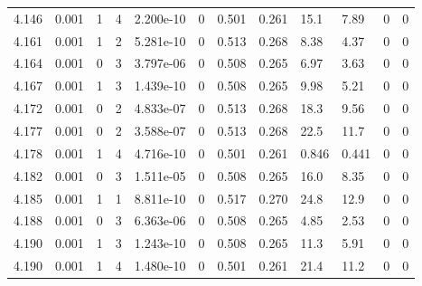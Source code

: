 \documentclass[preview]{standalone}
\begin{document}
{{{{{{{{{{\begin{tabular}{L{1.2cm}C{1.2cm} C{0.3cm}C{0.5cm} C{1.4cm}C{1.4cm} C{1.4cm}C{1.4cm} C{1.6cm}C{1.6cm} C{1.6cm}C{1.6cm}}
  4.146  &  0.001  & 1     &  4 &  2.200e-10  & 0  &  0.501&   0.261& 15.1 & 7.89   &  0 & 0  \\ 
  4.161  &  0.001  & 1     &  2 &  5.281e-10  & 0  &  0.513&   0.268& 8.38 & 4.37   &  0 & 0  \\ 
  4.164  &  0.001  & 0     &  3 &  3.797e-06  & 0  &  0.508&   0.265& 6.97 & 3.63   &  0 & 0  \\ 
  4.167  &  0.001  & 1     &  3 &  1.439e-10  & 0  &  0.508&   0.265& 9.98 & 5.21   &  0 & 0  \\ 
  4.172  &  0.001  & 0     &  2 &  4.833e-07  & 0  &  0.513&   0.268& 18.3 & 9.56   &  0 & 0  \\ 
  4.177  &  0.001  & 0     &  2 &  3.588e-07  & 0  &  0.513&   0.268& 22.5 & 11.7   &  0 & 0  \\ 
  4.178  &  0.001  & 1     &  4 &  4.716e-10  & 0  &  0.501&   0.261& 0.846 & 0.441   &  0 & 0  \\ 
  4.182  &  0.001  & 0     &  3 &  1.511e-05  & 0  &  0.508&   0.265& 16.0 & 8.35   &  0 & 0  \\ 
  4.185  &  0.001  & 1     &  1 &  8.811e-10  & 0  &  0.517&   0.270& 24.8 & 12.9   &  0 & 0  \\ 
  4.188  &  0.001  & 0     &  3 &  6.363e-06  & 0  &  0.508&   0.265& 4.85 & 2.53   &  0 & 0  \\ 
  4.190  &  0.001  & 1     &  3 &  1.243e-10  & 0  &  0.508&   0.265& 11.3 & 5.91   &  0 & 0  \\ 
  4.190  &  0.001  & 1     &  4 &  1.480e-10  & 0  &  0.501&   0.261& 21.4 & 11.2   &  0 & 0  \\ 
\hline 
\end{tabular} 

}}}}}}}}}}
\end{document}
